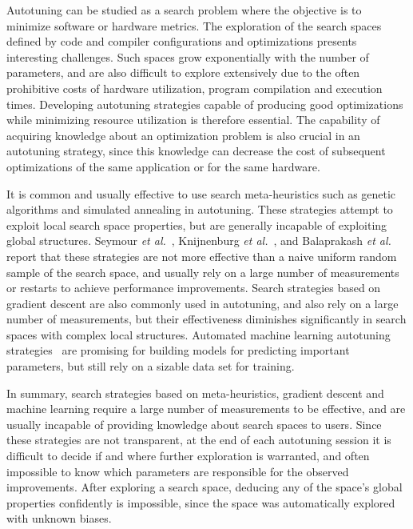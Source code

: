 \documentclass[conference]{IEEEtran}
\begin{document}
Autotuning can be studied as a search problem where the objective is to minimize
software or hardware metrics. The exploration of the search spaces defined by
code and compiler configurations and optimizations presents interesting
challenges. Such spaces grow exponentially with the number of parameters, and
are also difficult to explore extensively due to the often prohibitive costs of
hardware utilization, program compilation and execution times. Developing
autotuning strategies capable of producing good optimizations while minimizing
resource utilization is therefore essential. The capability of acquiring
knowledge about an optimization problem is also crucial in an autotuning
strategy, since this knowledge can decrease the cost of subsequent optimizations
of the same application or for the same hardware.

It is common and usually effective to use search meta-heuristics such as genetic
algorithms and simulated annealing in autotuning. These strategies attempt to
exploit local search space properties, but are generally incapable of exploiting
global structures. Seymour \emph{et al.}~\cite{seymour2008comparison},
Knijnenburg \emph{et al.}~\cite{knijnenburg2003combined}, and Balaprakash \emph{et
al.}~\cite{balaprakash2011can,balaprakash2012experimental} report that
these strategies are not more effective than a naive uniform random sample of
the search space, and usually rely on a large number of measurements or restarts
to achieve performance improvements. Search strategies based on gradient descent
are also commonly used in autotuning, and also rely on a large number of
measurements, but their effectiveness diminishes significantly in search spaces
with complex local structures. Automated machine learning autotuning
strategies~\cite{beckingsale2017apollo,falch2017machine,balaprakash2016automomml}
are promising for building models for predicting important parameters, but still
rely on a sizable data set for training.

In summary, search strategies based on meta-heuristics, gradient descent and
machine learning require a large number of measurements to be effective, and are
usually incapable of providing knowledge about search spaces to users. Since
these strategies are not transparent, at the end of each autotuning session it
is difficult to decide if and where further exploration is warranted, and often
impossible to know which parameters are responsible for the observed
improvements. After exploring a search space, deducing any of the space's global
properties confidently is impossible, since the space was automatically explored
with unknown biases.
\end{document}
